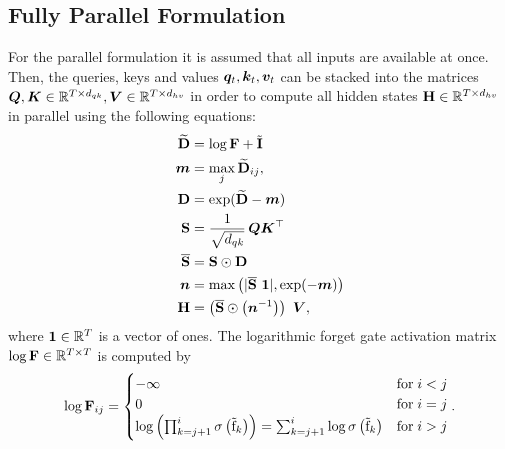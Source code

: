 \documentclass{article}
\begin{document}
    \subsection{Fully Parallel Formulation}
    \label{app:parallel_formulation}
    For the parallel formulation it is assumed that all inputs are available at once.
    Then, the queries, keys and values $\bm{q}_t,\bm{k}_t,\bm{v}_t$ can be stacked into the matrices $\bm{Q}, \bm{K} \in \mathbb{R}^{T \times d_{qk}}, \bm{V} \in \mathbb{R}^{T \times d_{hv}}$ in order to compute all hidden states $\bm{\mathrm{H}} \in \mathbb{R}^{T \times d_{hv}}$ in parallel using the following equations:
    \begin{alignat}{2}
        \widetilde{\bm{\mathrm{D}}} & = \log \bm{\mathrm{F}} + \tilde{\bm{\mathrm{I}}}                                                             \\
        \bm{m}                  & = \max_j \widetilde{\bm{\mathrm{D}}}_{ij}, \quad                                                      \\
        \bm{\mathrm{D}}             & = \exp(\widetilde{\bm{\mathrm{D}}} - \bm{m})                                                             \\
        \bm{\mathrm{S}}             & = \frac{1}{\sqrt{d_{qk}}} \, \bm{Q}\bm{K}^\top                                                       \\
        \overline{\bm{\mathrm{S}}}  & =\bm{\mathrm{S}} \odot \bm{\mathrm{D}}                                                                         \\
        \bm{n}                  & = \max \left( |\overline{\bm{\mathrm{S}}} \ \bm{1}|, \exp(-\bm{m}) \right)  \label{eq:parallel_normalizer} \\
        \bm{\mathrm{H}}             & = \left(\overline{\bm{\mathrm{S}}} \odot \left(\bm{n}^{-1}\right)\right) \ \bm{V},
    \end{alignat}
    where $\bm{1} \in \mathbb{R}^{T}$ is a vector of ones.
    The logarithmic forget gate activation matrix $\log \bm{\mathrm{F}} \in \mathbb{R}^{T \times T}$ is computed by
    \begin{equation}
        \log \bm{\rF}_{ij} = \begin{cases}
            - \infty                                                                                                           & \text{for} \; i < j \\ %
            0                                                                                                           & \text{for} \; i = j \\ %
            \log \left(\prod_{k=j+1}^{i} \sigma\left(\tilde{\Rf}_k\right) \right) = \sum_{k=j+1}^{i} \log \sigma\left(\tilde{\Rf}_k\right) & \text{for} \; i > j %
        \end{cases}.
    \end{equation}
\end{document}
